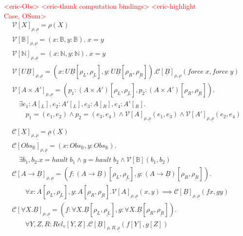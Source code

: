 \documentclass[acmsmall]{acmart}
\newcommand{\eric}[1]{\textcolor{red}{ <eric-#1> }}
\begin{document}
\begin{figure}[H]
  \centering
  \scriptsize
  \eric{Obs}
  \eric{thunk computation bindings}
  \eric{highlight Case, OSum}
  \begin{align*}
    &\mathcal{V}[X]_{\rho,\underline{\rho}} = \rho(X)\\
    &\mathcal{V}[\mathbb{B}]_{\rho,\underline{\rho}} = (x:\mathbb{B}, y: \mathbb{B}). \; x = y\\
    &\mathcal{V}[\mathbb{N}]_{\rho,\underline{\rho}} =(x:\mathbb{N}, y: \mathbb{N}). \; x = y\\
    &\mathcal{V}[U\underline{B}]_{\rho,\underline{\rho}} = (x : U\underline{B}[\rho_L,\underline{\rho_L}], y :U\underline{B}[\rho_R,\underline{\rho_R}] ). \mathcal{C}[\underline{B}]_{\rho,\underline{\rho}}(force\;x, force\; y)
    \\
    &\mathcal{V}[A\times A']_{\rho,\underline{\rho}} = (p_1 : (A\times A')[\rho_L,\underline{\rho_L}],p_2 : (A\times A')[\rho_R,\underline{\rho_R}]).\\
    &\quad  
    \exists e_1:A[_L],e_2:A'[_L],e_3:A[_R],e_4: A'[_R].\\
    &\quad \quad p_1 = (e_1,e_2) \land p_2 = (e_3,e_4) \land \mathcal{V}[A]_{\rho,\underline{\rho}}(e_1,e_3) \land \mathcal{V}[A']_{\rho,\underline{\rho}}(e_2,e_4)
    \\
    \\
    &\mathcal{C}[\underline{X}]_{\rho,\underline{\rho}} = \underline{\rho}(\underline{X})\\
    &\mathcal{C}[Obs_{\mathbb{B}}]_{\rho,\underline{\rho}} = (x: Obs_{\mathbb{B}},y: Obs_{\mathbb{B}}).\\
    &\quad \exists b_1,b_2 . x = hault \; b_1 \land y = hault \;b_2 \land  \mathcal{V}[\mathbb{B}](b_1,b_2)\\
    &\mathcal{C}[A\rightarrow \underline{B}]_{\rho,\underline{\rho}} = (f : (A \rightarrow \underline{B})[\rho_L,\underline{\rho_L}],g : (A \rightarrow \underline{B})[\rho_R,\underline{\rho_R}]).\\&\;\;\;\;\;\;\;\forall x : A[\rho_L,\underline{\rho_L}], y: A[\rho_R,\underline{\rho_R}].\mathcal{V}[A]_{\rho,\underline{\rho}}(x,y) \implies \mathcal{C}[\underline{B}]_{\rho,\underline{\rho}}(fx,gy)\\
    &\mathcal{C}[\forall X. \underline{B}]_{\rho,\underline{\rho}} = (f : \forall X.\underline{B}[\rho_L,\underline{\rho_L}],g : \forall X.\underline{B}[\rho_R,\underline{\rho_R}]). \\&\;\;\;\;\;\;\;
    \forall Y,Z,R:Rel_v[Y,Z]. \mathcal{C}[\underline{B}]_{\rho,R,\underline{\rho}}(f[Y],g[Z])

\end{align*}
\end{figure}
\end{document}
